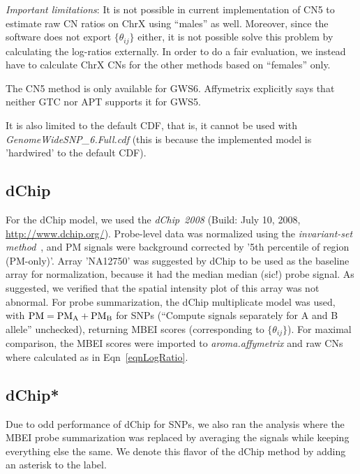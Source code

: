 \documentclass[11pt,a4paper]{article}
\newcommand{\GWSFive}{GWS5\xspace}
\newcommand{\GWSSix}{GWS6\xspace}
\newcommand{\PMA}{\ensuremath{\textnormal{PM}_\textnormal{A}}\xspace}
\newcommand{\PMB}{\ensuremath{\textnormal{PM}_\textnormal{B}}\xspace}
\newcommand{\filename}[1]{\textit{#1}\xspace}
\newcommand{\pkg}[1]{\textit{#1}\xspace}
\newcommand{\PM}{\textnormal{PM}\xspace}
\newcommand{\citep}[1]{\cite{#1}}
\begin{document}
\textit{Important limitations}:
It is not possible in current implementation of CN5 to estimate raw CN ratios on ChrX using ``males'' as well.  Moreover, since the software does not export $\{\theta_{ij}\}$ either, it is not possible solve this problem by calculating the log-ratios externally.  In order to do a fair evaluation, we instead have to calculate ChrX CNs for the other methods based on ``females'' only.

The CN5 method is only available for \GWSSix.  Affymetrix explicitly says that neither GTC nor APT supports it for \GWSFive.

It is also limited to the default CDF, that is, it cannot be used with \filename{GenomeWideSNP\_6.Full.cdf} (this is because the implemented model is 'hardwired' to the default CDF).



\subsection*{dChip}
For the dChip model, we used the \pkg{dChip~2008} (Build: July 10, 2008, \url{http://www.dchip.org/}).  Probe-level data was normalized using the \emph{invariant-set method}~\citep{LiWong_2001}, and PM signals were background corrected by '5th percentile of region (PM-only)'.  Array 'NA12750' was suggested by dChip to be used as the baseline array for normalization, because it had the median median (sic!) probe signal.  As suggested, we verified that the spatial intensity plot of this array was not abnormal.
For probe summarization, the dChip multiplicate model was used, with $\PM=\PMA+\PMB$ for SNPs (``Compute signals separately for A and B allele'' unchecked), returning MBEI scores (corresponding to $\{\theta_{ij}\}$).  For maximal comparison, the MBEI scores were imported to \pkg{aroma.affymetrix} and raw CNs where calculated as in Eqn~\eqref{eqnLogRatio}.


\subsection*{dChip*}
Due to odd performance of dChip for SNPs, we also ran the analysis where the MBEI probe summarization was replaced by averaging the signals while keeping everything else the same.  We denote this flavor of the dChip method by adding an asterisk to the label.
\end{document}
